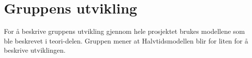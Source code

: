 \chapter{Gruppens utvikling}

For å beskrive gruppens utvikling gjennom hele prosjektet brukes modellene som ble beskrevet i teori-delen.
Gruppen mener at Halvtidsmodellen blir for liten for å beskrive utviklingen.

